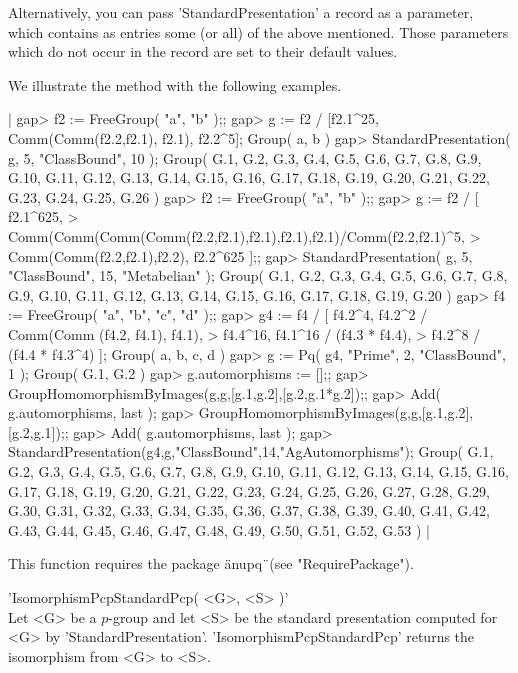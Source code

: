 Alternatively,  you  can  pass   'StandardPresentation'  a  record  as  a
parameter,  which  contains  as  entries  some  (or  all)  of  the  above
mentioned.  Those parameters which do not occur in the record are set  to
their default values.

We illustrate the method with the following examples.

|    gap> f2 := FreeGroup( "a", "b" );;
    gap> g := f2 / [f2.1^25, Comm(Comm(f2.2,f2.1), f2.1), f2.2^5];
    Group( a, b )
    gap> StandardPresentation( g, 5, "ClassBound", 10 );
    Group( G.1, G.2, G.3, G.4, G.5, G.6, G.7, G.8, G.9, G.10, G.11, G.12,
    G.13, G.14, G.15, G.16, G.17, G.18, G.19, G.20, G.21, G.22, G.23,
    G.24, G.25, G.26 )
    gap> f2 := FreeGroup( "a", "b" );;
    gap> g := f2 / [ f2.1^625,
    >  Comm(Comm(Comm(Comm(f2.2,f2.1),f2.1),f2.1),f2.1)/Comm(f2.2,f2.1)^5,
    >  Comm(Comm(f2.2,f2.1),f2.2), f2.2^625 ];;
    gap> StandardPresentation( g, 5, "ClassBound", 15, "Metabelian" );
    Group( G.1, G.2, G.3, G.4, G.5, G.6, G.7, G.8, G.9, G.10, G.11, G.12,
    G.13, G.14, G.15, G.16, G.17, G.18, G.19, G.20 )
    gap> f4 := FreeGroup( "a", "b", "c", "d" );;
    gap> g4 := f4 / [ f4.2^4, f4.2^2 / Comm(Comm (f4.2, f4.1), f4.1),
    >                f4.4^16, f4.1^16 / (f4.3 * f4.4),
    >                f4.2^8 / (f4.4 * f4.3^4) ];
    Group( a, b, c, d )
    gap> g := Pq( g4, "Prime", 2, "ClassBound", 1 );
    Group( G.1, G.2 )
    gap> g.automorphisms := [];;
    gap> GroupHomomorphismByImages(g,g,[g.1,g.2],[g.2,g.1*g.2]);;
    gap> Add( g.automorphisms, last );
    gap> GroupHomomorphismByImages(g,g,[g.1,g.2],[g.2,g.1]);;
    gap> Add( g.automorphisms, last );
    gap> StandardPresentation(g4,g,"ClassBound",14,"AgAutomorphisms");
    Group( G.1, G.2, G.3, G.4, G.5, G.6, G.7, G.8, G.9, G.10, G.11, G.12,
    G.13, G.14, G.15, G.16, G.17, G.18, G.19, G.20, G.21, G.22, G.23,
    G.24, G.25, G.26, G.27, G.28, G.29, G.30, G.31, G.32, G.33, G.34,
    G.35, G.36, G.37, G.38, G.39, G.40, G.41, G.42, G.43, G.44, G.45,
    G.46, G.47, G.48, G.49, G.50, G.51, G.52, G.53 ) |

This function requires the package \"anupq\"\ (see "RequirePackage").


'IsomorphismPcpStandardPcp( <G>, <S>  )' \\

Let  <G> be  a  $p$-group and  let <S>  be  the  standard presentation
computed for <G> by 'StandardPresentation'. 'IsomorphismPcpStandardPcp'
returns the isomorphism from <G> to <S>.


